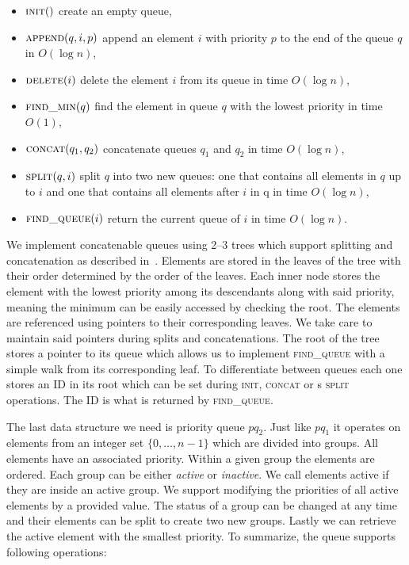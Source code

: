 \begin{itemize}
    \item $\textsc{init}()$ create an empty queue,
    \item $\textsc{append}(q, i, p)$ append an element $i$ with priority $p$ to the end of the queue $q$ in $O(\log n)$,
    \item $\textsc{delete}(i)$ delete the element $i$ from its queue in time $O(\log n)$,
    \item $\textsc{find\_min}(q)$ find the element in queue $q$ with the lowest priority in time $O(1)$,
    \item $\textsc{concat}(q_1, q_2)$ concatenate queues $q_1$ and $q_2$ in time $O(\log n)$,
    \item $\textsc{split}(q, i)$ split $q$ into two new queues: one that contains all elements in $q$ up to $i$ and one that contains all elements after $i$ in q in time $O(\log n)$,
    \item $\textsc{find\_queue}(i)$ return the current queue of $i$ in time $O(\log n)$.
\end{itemize}

We implement concatenable queues using 2–3 trees which support splitting and concatenation as described in~\cite{aho1974design}. Elements are stored in the leaves of the tree with their order determined by the order of the leaves. Each inner node stores the element with the lowest priority among its descendants along with said priority, meaning the minimum can be easily accessed by checking the root. The elements are referenced using pointers to their corresponding leaves. We take care to maintain said pointers during splits and concatenations. The root of the tree stores a pointer to its queue which allows us to implement \textsc{find\_queue} with a simple walk from its corresponding leaf. To differentiate between queues each one stores an ID in its root which can be set during \textsc{init}, \textsc{concat} or s \textsc{split} operations. The ID is what is returned by \textsc{find\_queue}.

The last data structure we need is priority queue $pq_2$. Just like $pq_1$ it operates on elements from an integer set $\{0, \dots, n-1\}$ which are divided into groups. All elements have an associated priority. Within a given group the elements are ordered. Each group can be either \textit{active} or \textit{inactive}. We call elements active if they are inside an active group. We support modifying the priorities of all active elements by a provided value. The status of a group can be changed at any time and their elements can be split to create two new groups. Lastly we can retrieve the active element with the smallest priority. To summarize, the queue supports following operations:

